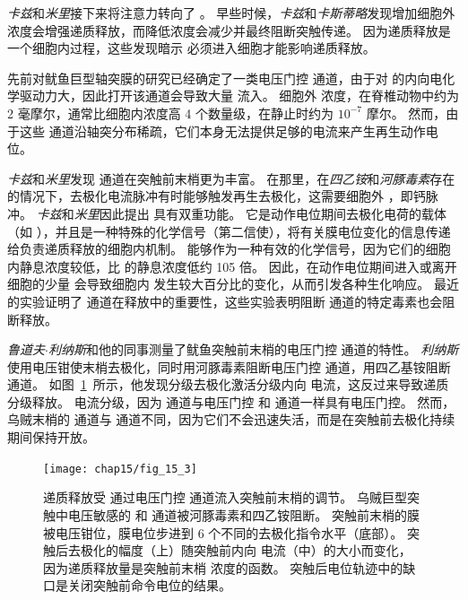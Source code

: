\textit{卡兹}和\textit{米里}接下来将注意力转向了 。
早些时候，\textit{卡兹}和\textit{卡斯蒂略}发现增加细胞外  浓度会增强递质释放，而降低浓度会减少并最终阻断突触传递。
因为递质释放是一个细胞内过程，这些发现暗示  必须进入细胞才能影响递质释放。


先前对鱿鱼巨型轴突膜的研究已经确定了一类电压门控  通道，由于对  的内向电化学驱动力大，因此打开该通道会导致大量  流入。
细胞外  浓度，在脊椎动物中约为 2 毫摩尔，通常比细胞内浓度高 4 个数量级，在静止时约为 $10^{-7}$ 摩尔。
然而，由于这些  通道沿轴突分布稀疏，它们本身无法提供足够的电流来产生再生动作电位。


\textit{卡兹}和\textit{米里}发现  通道在突触前末梢更为丰富。
在那里，在\textit{四乙铵}和\textit{河豚毒素}存在的情况下，去极化电流脉冲有时能够触发再生去极化，这需要细胞外 ，即钙脉冲。
\textit{卡兹}和\textit{米里}因此提出  具有双重功能。
它是动作电位期间去极化电荷的载体（如 ），并且是一种特殊的化学信号（第二信使），将有关膜电位变化的信息传递给负责递质释放的细胞内机制。
 能够作为一种有效的化学信号，因为它们的细胞内静息浓度较低，比  的静息浓度低约 105 倍。
因此，在动作电位期间进入或离开细胞的少量  会导致细胞内  发生较大百分比的变化，从而引发各种生化响应。
最近的实验证明了  通道在释放中的重要性，这些实验表明阻断  通道的特定毒素也会阻断释放。


\textit{鲁道夫$\cdot$利纳斯}和他的同事测量了鱿鱼突触前末梢的电压门控  通道的特性。
\textit{利纳斯}使用电压钳使末梢去极化，同时用河豚毒素阻断电压门控  通道，用四乙基铵阻断  通道。
如图~\ref{fig:15_3}~所示，他发现分级去极化激活分级内向  电流，这反过来导致递质分级释放。
 电流分级，因为  通道与电压门控  和  通道一样具有电压门控。
然而，乌贼末梢的  通道与  通道不同，因为它们不会迅速失活，而是在突触前去极化持续期间保持开放。


\begin{figure}[htbp]
	\centering
	\texttt{[image: chap15/fig\_15\_3]}
	\caption{递质释放受  通过电压门控  通道流入突触前末梢的调节。
	乌贼巨型突触中电压敏感的  和  通道被河豚毒素和四乙铵阻断。
	突触前末梢的膜被电压钳位，膜电位步进到 6 个不同的去极化指令水平（底部）。
	突触后去极化的幅度（上）随突触前内向  电流（中）的大小而变化，因为递质释放量是突触前末梢  浓度的函数。
	突触后电位轨迹中的缺口是关闭突触前命令电位的结果\cite{llinas1977depolarization}。}
	\label{fig:15_3}
\end{figure}



